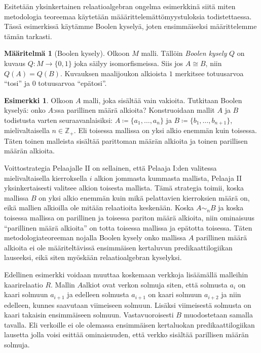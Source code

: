 \documentclass[finnish]{tktltiki2}
\theoremstyle{definition}
\newtheorem{maar}[lau]{Määritelmä}
\newtheorem{esim}[lau]{Esimerkki}
\theoremstyle{remark}
\begin{document}
Esitetään yksinkertainen relaatioalgebran ongelma esimerkkinä siitä miten metodologia teoreemaa käytetään määärittelemättömyystuloksia todistettaessa. Tässä esimerkissä käytämme Boolen kyselyä, joten ensimmäiseksi määrittelemme tämän tarkasti.

\begin{maar}[Boolen kysely]
Olkoon $M$ malli. Tällöin \textit{Boolen kysely} $Q$ on kuvaus $Q: M \to \{0, 1\}$ joka säilyy isomorfismeissa. Siis jos $A \cong B$, niin $Q(A) = Q(B)$. Kuvauksen maalijoukon alkioista $1$ merkitsee totuusarvoa ``tosi'' ja $0$ totuusarvoa ``epätosi''.
\end{maar}

\begin{esim}
Olkoon $A$ malli, joka sisältää vain vakioita. Tutkitaan Boolen kyselyä: onko $A$:ssa parillinen määrä alkioita? Konstruoidaan mallit $A$ ja $B$ todistusta varten seuraavanlaisiksi: $A \coloneqq \{a_1, \ldots, a_n\}$ ja $B \coloneqq \{b_1, \ldots, b_{n + 1}\}$, mielivaltaisella $n \in \mathbb{Z}_+$. Eli toisessa mallissa on yksi alkio enemmän kuin toisessa. Täten toinen malleista sisältää parittoman määrän alkioita ja toinen parillisen määrän alkioita.

Voittostrategia Pelaajalle II on sellainen, että Pelaaja I:den valitessa mielivaltaisella kierroksella $i$ alkion jommasta kummasta mallista, Pelaaja II yksinkertaisesti valitsee alkion toisesta mallista. Tämä strategia toimii, koska mallissa $B$ on yksi alkio enemmän kuin mikä pelattavien kierroksien määrä on, eikä mallien alkioilla ole mitään relaatioita keskenään. Koska $A \sim_n B$ ja koska toisessa mallissa on parillinen ja toisessa pariton määrä alkioita, niin ominaisuus ``parillinen määrä alkioita'' on totta toisessa mallissa ja epätotta toisessa. Täten metodologiateoreeman nojalla Boolen kysely onko mallissa $A$ parillinen määrä alkioita ei ole määriteltävissä ensimmäisen kertaluvun predikaattilogiikan lauseeksi, eikä siten myöskään relaatioalgebran kyselyksi.
\end{esim}

Edellinen esimerkki voidaan muuttaa koskemaan verkkoja lisäämällä malleihin kaarirelaatio $R$. Mallin $A$alkiot ovat verkon solmuja siten, että solmusta $a_i$ on kaari solmuun $a_{i + 1}$ ja edelleen solmusta $a_{i + 1}$ on kaari solmuun $a_{i + 2}$ ja niin edelleen, kunnes saavutaan viimeiseen solmuun. Lisäksi viimeisestä solmusta on kaari takaisin ensimmäiseen solmuun. Vastavuoroisesti $B$ muodostetaan samalla tavalla. Eli verkoille ei ole olemassa ensimmäisen kertaluokan predikaattilogiikan lausetta jolla voisi esittää ominaisuuden, että verkko sisältää parillisen määrän solmuja.
\end{document}
